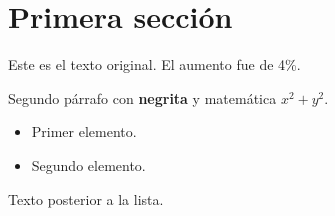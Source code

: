\documentclass{article}
\begin{document}
\section{Primera sección}

Este es el texto original. El aumento fue de 4\%.

Segundo párrafo con \textbf{negrita} y matemática \(x^2+y^2\).

\begin{itemize}
    \item Primer elemento.
    \item Segundo elemento.
\end{itemize}

Texto posterior a la lista.
\end{document}
